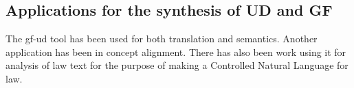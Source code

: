 

\subsection{Applications for the synthesis of UD and GF}

The gf-ud tool has been used for both translation and semantics\cite{ranta-al-2020}. %
Another application has been in concept alignment\cite{masciolini-ranta-2021}.
There has also been work using it for analysis of law text for the purpose of making a Controlled Natural Language for law\cite{listenmaa-etal-2021-towards}.





%
%
%

